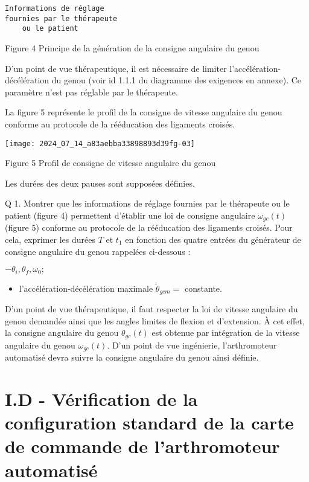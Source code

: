 \begin{verbatim}
Informations de réglage
fournies par le thérapeute
    ou le patient
\end{verbatim}

Figure 4 Principe de la génération de la consigne angulaire du genou

D'un point de vue thérapeutique, il est nécessaire de limiter l'accélération-décélération du genou (voir id 1.1.1 du diagramme des exigences en annexe). Ce paramètre n'est pas réglable par le thérapeute.

La figure 5 représente le profil de la consigne de vitesse angulaire du genou conforme au protocole de la rééducation des ligaments croisés.

\begin{center}
\texttt{[image: 2024\_07\_14\_a83aebba33898893d39fg-03]}
\end{center}

Figure 5 Profil de consigne de vitesse angulaire du genou

Les durées des deux pauses sont supposées définies.

Q 1. Montrer que les informations de réglage fournies par le thérapeute ou le patient (figure 4) permettent d'établir une loi de consigne angulaire $\omega_{g c}(t)$ (figure 5) conforme au protocole de la rééducation des ligaments croisés. Pour cela, exprimer les durées $T$ et $t_{1}$ en fonction des quatre entrées du générateur de consigne angulaire du genou rappelées ci-dessous :

$-\theta_{i}, \theta_{f}, \omega_{0} ;$

\begin{itemize}
  \item l'accélération-décélération maximale $\ddot{\theta}_{g c m}=$ constante.
\end{itemize}

D'un point de vue thérapeutique, il faut respecter la loi de vitesse angulaire du genou demandée ainsi que les angles limites de flexion et d'extension. À cet effet, la consigne angulaire du genou $\theta_{g c}(t)$ est obtenue par intégration de la vitesse angulaire du genou $\omega_{g c}(t)$. D'un point de vue ingénierie, l'arthromoteur automatisé devra suivre la consigne angulaire du genou ainsi définie.

\section*{I.D - Vérification de la configuration standard de la carte de commande de l'arthromoteur automatisé}
